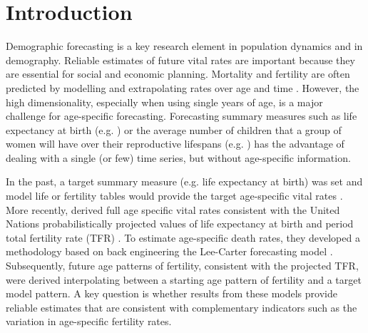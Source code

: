 \documentclass[12pt,a4paper,twoside]{article}
\begin{document}
	
	
	

	\newpage
\setcounter{page}{1}	

\section{Introduction}\label{sec:Intro}

Demographic forecasting is a key research element in population dynamics and in demography. Reliable estimates of future vital rates are important because they are essential for social and economic planning. Mortality and fertility are often predicted by modelling and extrapolating rates over age and time \citep{Booth2006,bohk2018forecast}. However, the high dimensionality, especially when using single years of age, is a major challenge for age-specific forecasting. Forecasting summary measures such as life expectancy at birth (e.g. \citet{pascariu2018double}) or the average number of children that a group of women will have over their reproductive lifespans (e.g. \citet{alkema2011probabilistic}) has the advantage of dealing with a single (or few) time series, but without age-specific information. 

In the past, a target summary measure (e.g. life expectancy at birth) was set and model life or fertility tables would provide the target age-specific vital rates \citep{Booth2006}. More recently, \citet{vsevvcikova2016age} derived full age specific vital rates consistent with the United Nations probabilistically projected values of life expectancy at birth and period total fertility rate (TFR) \citep{gerland2014WorldPopulationStabilization}. To estimate age-specific death rates, they developed a methodology based on back engineering the Lee-Carter forecasting model \citep{lee1992modeling}. Subsequently, future age patterns of fertility, consistent with the projected TFR, were derived interpolating between a starting age pattern of fertility and a target model pattern. %
A key question is whether results from these models provide reliable estimates that are consistent with complementary indicators such as the variation in age-specific fertility rates. 
\end{document}

